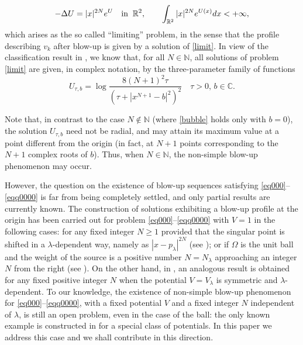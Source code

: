 \documentclass[reqno,11pt]{amsart}
\theoremstyle{definition}
\numberwithin{equation}{section}
\newcommand{\C}{\mathbb{C}}
\newcommand{\N}{\mathbb{N}}
\newcommand{\rr}{\mathbb{R}}
\newcommand{\R}{\mathbb{R}}
\newcommand{\la}{\lambda}
\renewcommand{\(}{\left(}
\renewcommand{\)}{\right)}
\renewcommand{\[}{\left[}
\renewcommand{\]}{\right]}
\newcommand{\beq}{\begin{equation}}
\newcommand{\eeq}{\end{equation}}
\begin{document}
\beq\label{limit}
-\Delta U=|x|^{2N}e^U\quad \hbox{in}\;\; \rr^2,\qquad
\int_{\R^2} |x|^{2N}e^{U(x)}dx<+\infty,
\eeq which arises as the so called “limiting” problem, in the sense that the profile describing $v_k$ after blow-up is given by a solution of \eqref{limit}.
In view of the classification result in \cite{Pratar}, we know that, for all $N\in\N$, all solutions of  problem \eqref{limit} are given, in complex notation,  by the three-parameter family of functions \beq\label{bubble} U_{\tau, b}=
\log  \frac{8(N+1)^2\tau}{ (\tau+|x^{N+1}-  b|^2)^2}\quad
\tau>0,\,b\in \C.
\eeq

Note that, in contrast to the case $N\not\in\N$ (where \eqref{bubble} holds only with $b=0$), the solution $U_{\tau, b}$ need not be radial, and may attain its maximum value at a point different from the origin (in fact, at $N+1$ points corresponding to the $N+1$ complex roots of $b$). Thus, when $N\in\N$, the non-simple blow-up phenomenon may occur. 

However, the question on the existence of 
blow-up sequences satisfying  \eqref{eq000}--\eqref{eqq0000} 
 is far from being completely settled, and  
only partial results are currently known. The construction of solutions exhibiting a 
blow-up profile at the origin has been carried out for problem \eqref{eq000}--\eqref{eqq0000} with $V = 1$ in the following cases: for any fixed integer $N\geq 1$ provided that the singular point is shifted in a 
$\la$-dependent way, namely as $|x-p_\la|^{2N}$  (see \cite{delespomu}); or if $\Omega$ is the unit ball and the weight of the source is a positive number $N = N_\la$ approaching an integer $N$ from the right  (see \cite{dawe}). On the other hand, in \cite{dawezhasym}, an analogous result is obtained  for any fixed positive integer $N$ when the potential $V=V_\la$ is symmetric and $\la$-dependent. To our knowledge, the existence of non-simple blow-up phenomenon for \eqref{eq000}--\eqref{eqq0000},  with a fixed potential $V$ and a fixed integer $N$ independent of $\la$, is still an open problem, even in the case of the ball: the only known example is constructed in 
\cite{dawezhaasy} for a special class of potentials.
 In this paper we address this case and we  shall contribute in this direction. 
\
\end{document}
